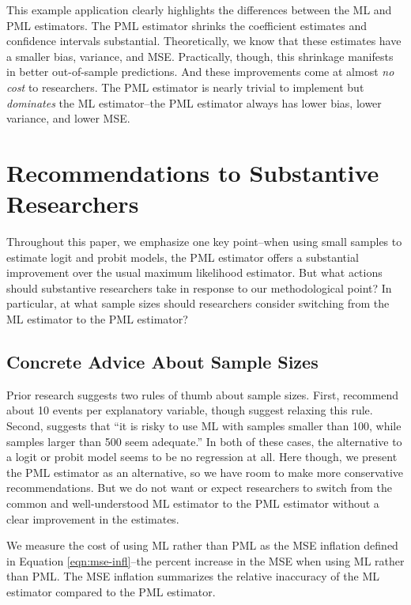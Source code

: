 \documentclass[12pt]{article}
\begin{document}
This example application clearly highlights the differences between the ML and PML estimators. 
The PML estimator shrinks the coefficient estimates and confidence intervals substantial. 
Theoretically, we know that these estimates have a smaller bias, variance, and MSE.
Practically, though, this shrinkage manifests in better out-of-sample predictions.
And these improvements come at almost \textit{no cost} to researchers. 
The PML estimator is nearly trivial to implement but \textit{dominates} the ML estimator--the PML estimator always has lower bias, lower variance, and lower MSE.

\section*{Recommendations to Substantive Researchers}

Throughout this paper, we emphasize one key point--when using small samples to estimate logit and probit models, the PML estimator offers a substantial improvement over the usual maximum likelihood estimator. 
But what actions should substantive researchers take in response to our methodological point? 
In particular, at what sample sizes should researchers consider switching from the ML estimator to the PML estimator?

\subsection*{Concrete Advice About Sample Sizes}

Prior research suggests two rules of thumb about sample sizes.
First, \cite{Peduzzietal1996} recommend about 10 events per explanatory variable, though \cite{VittinghoffMcCulloch2007} suggest relaxing this rule. 
Second, \citet[p. 54]{Long1997} suggests that ``it is risky to use ML with samples smaller than 100, while samples larger than 500 seem adequate.'' 
In both of these cases, the alternative to a logit or probit model seems to be no regression at all.
Here though, we present the PML estimator as an alternative, so we have room to make more conservative recommendations.
But we do not want or expect researchers to switch from the common and well-understood ML estimator to the PML estimator without a clear improvement in the estimates.

We measure the cost of using ML rather than PML as the MSE inflation defined in Equation \ref{eqn:mse-infl}--the percent increase in the MSE when using ML rather than PML. 
The MSE inflation summarizes the relative inaccuracy of the ML estimator compared to the PML estimator.
\end{document}
